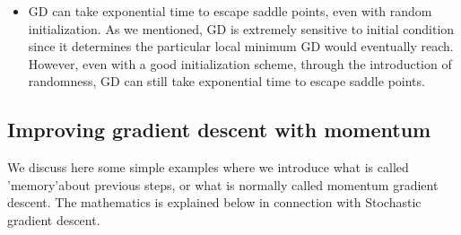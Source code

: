 \documentclass[%
oneside,                 %
final,                   %
10pt]{article}
\begin{document}
\begin{itemize}
\item GD can take exponential time to escape saddle points, even with random initialization. As we mentioned, GD is extremely sensitive to initial condition since it determines the particular local minimum GD would eventually reach. However, even with a good initialization scheme, through the introduction of randomness, GD can still take exponential time to escape saddle points.
\end{itemize}

\noindent
\subsection*{Improving gradient descent with momentum}

We discuss here some simple examples where we introduce what is called 'memory'about previous steps, or what is normally called momentum gradient descent. The mathematics is explained below in connection with Stochastic gradient descent.
\end{document}
